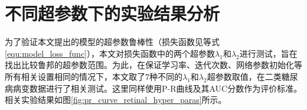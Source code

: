 
\section{不同超参数下的实验结果分析}\label{sec:hyper_paras}
为了验证本文提出的模型的超参数鲁棒性（损失函数见等式\ref{equ:model_loss_func}），本文对损失函数中的两个超参数$\lambda_{1}$和$\lambda_{2}$进行测试，旨在找出比较鲁邦的超参数范围。为此，在保证学习率、迭代次数、网络参数初始化等所有相关设置相同的情况下，本文取了$7$种不同的$\lambda_{1}$和$\lambda_{2}$超参数取值，在二类糖尿病病变数据进行了相关测试。这里同样使用P-R曲线及其AUC分数作为评价标准。相关实验结果如图\ref{fig:pr_curve_retinal_hyper_paras}所示。
